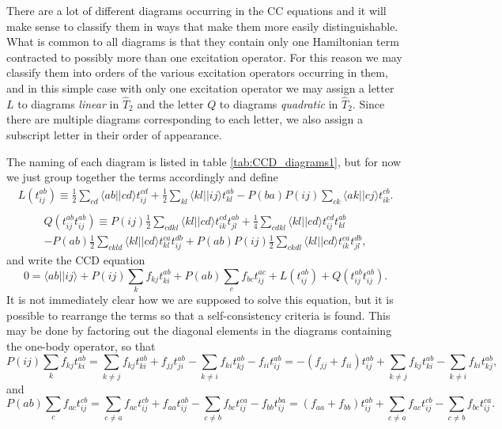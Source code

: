 There are a lot of different diagrams occurring in the CC
equations and it will make sense to classify them in ways that make
them more easily distinguishable. What is common to all diagrams is that
they contain only one Hamiltonian term contracted to possibly more
than one excitation operator. For this reason we may classify them
into orders of the various excitation operators occurring in them, and
in this simple case with only one excitation operator we may assign a
letter $L$ to diagrams \emph{linear} in $\hat{T}_2$ and the letter $Q$ to diagrams
\emph{quadratic} in $\hat{T}_2$. Since there are multiple diagrams
corresponding to each letter, we also assign a subscript letter in
their order of appearance.

The naming of each diagram is listed in table
\ref{tab:CCD_diagrams1}, but for now we just group together the terms
accordingly and define
\begin{multline}
L(t^{ab}_{ij}) \equiv 
\frac{1}{2} \sum_{cd} \langle ab \vert \vert cd \rangle t_{ij}^{cd} +
\frac{1}{2} \sum_{kl} \langle kl \vert \vert ij \rangle t_{kl}^{ab}-
P(ba)P(ij) \sum_{ck} \langle ak \vert \vert cj \rangle t_{ik}^{cb} .\\ 
\end{multline}
\begin{multline}
Q(t^{ab}_{ij}t^{ab}_{ij}) \equiv 
P(ij)\frac{1}{2} \sum_{cdkl} \langle kl \vert \vert cd \rangle t_{ik}^{cd} t_{jl}^{ab} 
+\frac{1}{4} \sum_{cdkl} \langle kl \vert \vert cd \rangle t_{ij}^{cd} t_{kl}^{ab} \\ - 
P(ab)\frac{1}{2} \sum_{ckld} \langle kl \vert \vert cd \rangle t_{kl}^{ca} t_{ij}^{db}+
P(ab)P(ij)\frac{1}{2} \sum_{ckdl} \langle kl \vert \vert cd \rangle t_{ik}^{ca} t_{jl}^{db},
\end{multline}
and write the CCD equation
\begin{equation}
0 =\langle ab \vert \vert ij \rangle + P(ij) \sum_{k} f_{kj} t_{ki}^{ab}+P(ab) \sum_{c} f_{bc} t_{ij}^{ac} + L(t^{ab}_{ij}) + Q(t^{ab}_{ij}t^{ab}_{ij}).
\end{equation}
It is not immediately clear how we are supposed to solve this
equation, but it is possible to rearrange the terms so that a
self-consistency criteria is found. This may be done by factoring out
the diagonal elements in the diagrams containing the one-body
operator, so that
\begin{equation}
P(ij) \sum_{k} f_{kj} t_{ki}^{ab} = \sum_{k \neq j} f_{kj} t_{ki}^{ab} + f_{jj} t_{ji}^{ab} - \sum_{k \neq i} f_{ki} t_{kj}^{ab}   - f_{ii} t_{ij}^{ab} =  -(f_{jj} + f_{ii}) t_{ij}^{ab} + \sum_{k \neq j} f_{kj} t_{ki}^{ab}  - \sum_{k \neq i} f_{ki} t_{kj}^{ab}  ,
\end{equation}
and
\begin{equation}
P(ab) \sum_{c} f_{ac} t_{ij}^{cb} = \sum_{c \neq a} f_{ac} t_{ij}^{cb} + f_{aa} t_{ij}^{ab} - \sum_{c \neq b} f_{bc} t_{ij}^{ca} -   f_{bb} t_{ij}^{ba} = (f_{aa} + f_{bb}) t_{ij}^{ab} +  \sum_{c \neq a} f_{ac} t_{ij}^{cb} - \sum_{c \neq b} f_{bc} t_{ij}^{ca}.
\end{equation}

